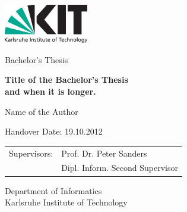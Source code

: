 \documentclass[12pt,a4paper,twoside]{scrartcl}
\numberwithin{equation}{section}
\begin{document}

\pagestyle{empty} %

\begin{titlepage}

  \begin{center}\large

    {\flushleft\includegraphics[height=17mm]{kit_logo_en.pdf} \hfill}

    \vfill

    Bachelor's Thesis
    \vspace*{2cm}

    {\bf\huge Title of the Bachelor's Thesis \\ and when it is longer. \par} %
  

    \vfill

    Name of the Author %

    \vspace*{15mm}

    Handover Date: 19.10.2012 %

    \vspace*{45mm}

    \begin{tabular}{rl}
      Supervisors: & Prof. Dr. Peter Sanders \\ %
      & Dipl. Inform. Second Supervisor \\
    \end{tabular}
    
    \vspace*{10mm}


     Department of Informatics \\
     Karlsruhe Institute of Technology

    \vspace*{12mm}
  \end{center}

\end{titlepage}
\end{document}
